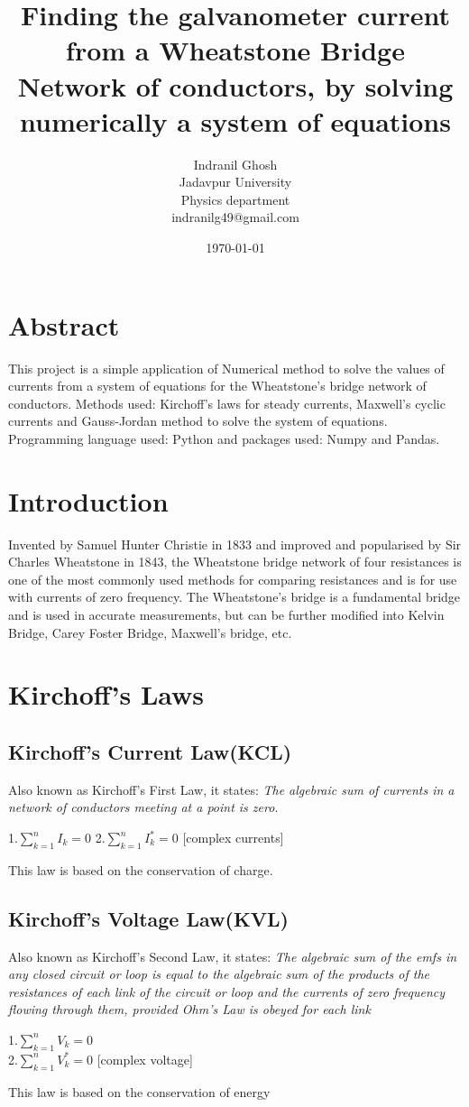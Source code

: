 \documentclass{article}
\title{Finding the galvanometer current from a Wheatstone Bridge Network of conductors, by solving numerically a system of equations}
\author{Indranil Ghosh\\Jadavpur University\\Physics department\\indranilg49@gmail.com}
\date{\today}
\begin{document}
\maketitle
\section{Abstract}
This project is a simple application of Numerical method to solve the values of currents from a system of equations for the Wheatstone's bridge network of conductors. Methods used: Kirchoff's laws for steady currents, Maxwell's cyclic currents and Gauss-Jordan method to solve the system of equations. Programming language used: Python and packages used: Numpy and Pandas. 

\section{Introduction}
Invented by Samuel Hunter Christie in 1833 and improved and popularised by Sir Charles Wheatstone in 1843, the Wheatstone bridge network of four resistances is one of the most commonly used methods for comparing resistances and is for use with currents of zero frequency. The Wheatstone's bridge is a fundamental bridge and is used in accurate measurements, but can be further modified into Kelvin Bridge, Carey Foster Bridge, Maxwell's bridge, etc.

\section{Kirchoff's Laws}
\subsection{Kirchoff's Current Law(KCL)}
Also known as Kirchoff's First Law, it states: \textit{The algebraic sum of currents in a network of conductors meeting at a point is zero}. \\
\begin{center}
1.$\sum_{k=1}^n I_k=0$
2.$\sum_{k=1}^n I^*_k=0$ [complex currents]
\end{center}
This law is based  on the conservation of charge.
\subsection{Kirchoff's Voltage Law(KVL)}
Also known as Kirchoff's Second Law, it states: \textit{The algebraic sum of the emfs in any closed circuit or loop is equal to the algebraic sum of the products of the resistances of each link of the circuit or loop and the currents of zero frequency flowing through them, provided Ohm's Law is obeyed for each link}
\begin{center}
1.$\sum_{k=1}^n V_k=0$\\
2.$\sum_{k=1}^n V^*_k=0$ [complex voltage]
\end{center}
This law is based on the conservation of energy
\end{document}
